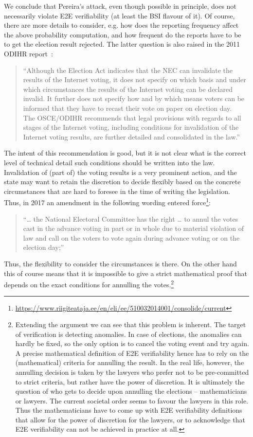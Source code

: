 \documentclass{llncs}
\newcommand{\footurl}[1]{\footnote{\url{#1}}}
\begin{document}
We conclude that Pereira's attack, even though possible in principle, does not necessarily violate E2E verifiability (at least the BSI flavour of it). Of course, there are more details to consider, e.g. how does the reporting frequency affect the above probability computation, and how frequent do the reports have to be to get the election result rejected. The latter question is also raised in the 2011 ODIHR report~\cite{ODIHR2011}:
\begin{quote}
    ``Although the Election Act indicates that the NEC can invalidate the results of the Internet voting, it does not specify on which basis and under which circumstances the results of the Internet voting can be declared invalid. It further does not specify how and by which means voters can be informed that they have to recast their vote on paper on election day.\\[1ex] 
    The OSCE/ODIHR recommends that legal provisions with regards to all stages of the Internet voting, including conditions for invalidation of the Internet voting results, are further detailed and consolidated in the law.''
\end{quote}

The intent of this recommendation is good, but it is not clear what is the correct level of technical detail such conditions should be written into the law. Invalidation of (part of) the voting results is a very prominent action, and the state may want to retain the discretion to decide flexibly based on the concrete circumstances that are hard to foresee in the time of writing the legislation. Thus, in 2017 an amendment in the following wording entered force\footurl{https://www.riigiteataja.ee/en/eli/ee/510032014001/consolide/current}:
\begin{quote}
    ``\dots{} the National Electoral Committee has the right \dots{} to annul the votes cast in the advance voting in part or in whole due to material violation of law and call on the voters to vote again during advance voting or on the election day;''
\end{quote}
Thus, the flexibility to consider the circumstances is there. On the other hand this of course means that it is impossible to give a strict mathematical proof that depends on the exact conditions for annulling the votes.\footnote{Extending the argument we can see that this problem is inherent. The target of verification is detecting anomalies. In case of elections, the anomalies can hardly be fixed, so the only option is to cancel the voting event and try again. A precise mathematical definition of E2E verifiability hence has to rely on the (mathematical) criteria for annulling the result. In the real life, however, the annulling decision is taken by the lawyers who prefer not to be pre-committed to strict criteria, but rather have the power of discretion. It is ultimately the question of who gets to decide upon annulling the elections -- mathematicians or lawyers. The current societal order seems to favour the lawyers in this role. Thus the mathematicians have to come up with E2E verifiability definitions that allow for the power of discretion for the lawyers, or to acknowledge that E2E verifiability can not be achieved in practice at all.}
\end{document}
